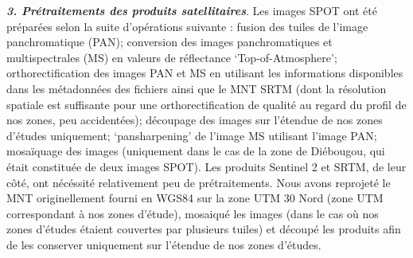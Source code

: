 \documentclass[12pt,twoside]{reedthesis}
\begin{document}
\textbf{\emph{3. Prétraitements des produits satellitaires}}. Les images SPOT ont été préparées selon la suite d'opérations suivante : fusion des tuiles de l'image panchromatique (PAN); conversion des images panchromatiques et multispectrales (MS) en valeurs de réflectance `Top-of-Atmosphere'; orthorectification des images PAN et MS en utilisant les informations disponibles dans les métadonnées des fichiers ainsi que le MNT SRTM (dont la résolution spatiale est suffisante pour une orthorectification de qualité au regard du profil de nos zones, peu accidentées); découpage des images sur l'étendue de nos zones d'études uniquement; `pansharpening' de l'image MS utilisant l'image PAN; mosaïquage des images (uniquement dans le cas de la zone de Diébougou, qui était constituée de deux images SPOT). Les produits Sentinel 2 et SRTM, de leur côté, ont nécéssité relativement peu de prétraitements. Nous avons reprojeté le MNT originellement fourni en WGS84 sur la zone UTM 30 Nord (zone UTM correspondant à nos zones d'étude), mosaiqué les images (dans le cas où nos zones d'études étaient couvertes par plusieurs tuiles) et découpé les produits afin de les conserver uniquement sur l'étendue de nos zones d'études.\\
\end{document}
